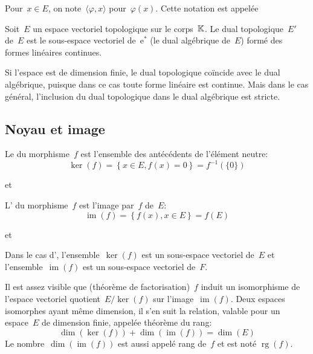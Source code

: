 \medskip
Pour~$x \in E$, on note~$\langle\varphi,x\rangle$ pour~$\varphi(x)$.
Cette notation est appelée 

\medskip
\begin{definition}
Soit~$E$ un espace vectoriel topologique sur le corps~$\mathbb K$.
Le dual topologique~$E'$ de~$E$ est le sous-espace vectoriel de~$\mathrm{e}^*$ (le dual algébrique de~$E$)
formé des formes linéaires continues.
\end{definition}
Si l'espace est de dimension finie, le dual topologique coïncide avec le dual algébrique,
puisque dans ce cas toute forme linéaire est continue.
Mais dans le cas général, l'inclusion du dual topologique dans le dual algébrique est stricte.

\medskip
\subsection{Noyau et image}

\begin{definition}[Noyau]
Le  du morphisme~$f$ est l'ensemble des antécédents de l'élément neutre:
\begin{equation} \ker(f)=\left\{x\in E, f(x)=0\right\}=f^{-1}(\{0\})\end{equation}
\end{definition}
et 

\medskip
\begin{definition}[Image]
L' du morphisme~$f$ est l'image par~$f$ de~$E$:
\begin{equation} \operatorname{im}(f)=\left\{ f(x), x\in E\right\}=f(E)\end{equation}
\end{definition}
et 

\medskip
Dans le cas d',
l'ensemble~$\ker(f)$ est un sous-espace vectoriel de~$E$ et
l'ensemble~$\operatorname{im}(f)$ est un sous-espace vectoriel de~$F$.

\begin{theoreme}
Il est assez visible que (théorème de factorisation)~$f$ induit un isomorphisme de
l'espace vectoriel quotient~$E/\ker(f)$ sur l'image~$\operatorname{im}(f)$.
Deux espaces isomorphes ayant même dimension, il s'en suit la relation,
valable pour un espace~$E$ de dimension finie, appelée théorème du rang:
\begin{equation}
  \dim(\ker(f)) + \dim(\operatorname{im}(f)) = \dim( E )
\end{equation}
Le nombre~$\dim(\operatorname{im}(f))$ est aussi appelé rang de~$f$ et est noté
$\operatorname{rg}(f)$.
\end{theoreme}

